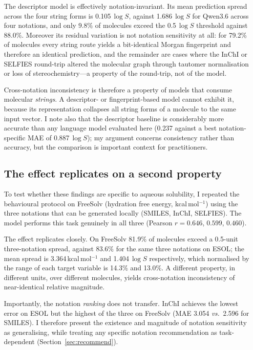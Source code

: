 \documentclass[twoside,twocolumn,9pt]{article}
\newcommand{\logS}{\ensuremath{\log S}}
\begin{document}
The descriptor model is effectively notation-invariant. Its mean prediction spread across the four string forms is 0.105\,$\logS$, against 1.686\,$\logS$ for Qwen3.6 across four notations, and only 9.8\% of molecules exceed the 0.5\,$\logS$ threshold against 88.0\%. Moreover its residual variation is not notation sensitivity at all: for 79.2\% of molecules every string route yields a bit-identical Morgan fingerprint and therefore an identical prediction, and the remainder are cases where the InChI or SELFIES round-trip altered the molecular graph through tautomer normalisation or loss of stereochemistry---a property of the round-trip, not of the model.

Cross-notation inconsistency is therefore a property of models that consume molecular \textit{strings}. A descriptor- or fingerprint-based model cannot exhibit it, because its representation collapses all string forms of a molecule to the same input vector. I note also that the descriptor baseline is considerably more accurate than any language model evaluated here (0.237 against a best notation-specific MAE of 0.887\,$\logS$); my argument concerns consistency rather than accuracy, but the comparison is important context for practitioners.

\subsection{The effect replicates on a second property}
\label{sec:freesolv}

To test whether these findings are specific to aqueous solubility, I repeated the behavioural protocol on FreeSolv\cite{mobley2014} (hydration free energy, kcal\,mol$^{-1}$) using the three notations that can be generated locally (SMILES, InChI, SELFIES). The model performs this task genuinely in all three (Pearson $r=0.646$, $0.599$, $0.460$).

The effect replicates closely. On FreeSolv 81.9\% of molecules exceed a 0.5-unit three-notation spread, against 83.6\% for the same three notations on ESOL; the mean spread is 3.364\,kcal\,mol$^{-1}$ and 1.404\,$\logS$ respectively, which normalised by the range of each target variable is 14.3\% and 13.0\%. A different property, in different units, over different molecules, yields cross-notation inconsistency of near-identical relative magnitude.

Importantly, the notation \textit{ranking} does not transfer. InChI achieves the lowest error on ESOL but the highest of the three on FreeSolv (MAE 3.054 \textit{vs.}\ 2.596 for SMILES). I therefore present the existence and magnitude of notation sensitivity as generalising, while treating any specific notation recommendation as task-dependent (Section~\ref{sec:recommend}).
\end{document}
